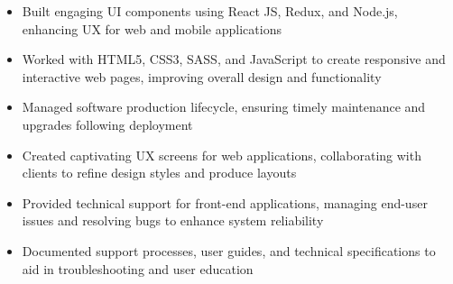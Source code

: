\par\smallskip
\noindent
\begin{minipage}{20cm}
  \begin{minipage}{9.75cm}
    \begin{itemize}
      \item Built engaging UI components using React JS, Redux, and Node.js, enhancing UX for web and mobile applications
      \item Worked with HTML5, CSS3, SASS, and JavaScript to create responsive and interactive web pages, improving overall design and functionality
      \item Managed software production lifecycle, ensuring timely maintenance and upgrades following deployment
    \end{itemize}
  \end{minipage}
  \hfill
  \begin{minipage}{9.75cm}
    \begin{itemize}
      \item Created captivating UX screens for web applications, collaborating with clients to refine design styles and produce layouts
      \item Provided technical support for front-end applications, managing end-user issues and resolving bugs to enhance system reliability
      \item Documented support processes, user guides, and technical specifications to aid in troubleshooting and user education
    \end{itemize}
  \end{minipage}
\end{minipage}
\par\smallskip
\divider

